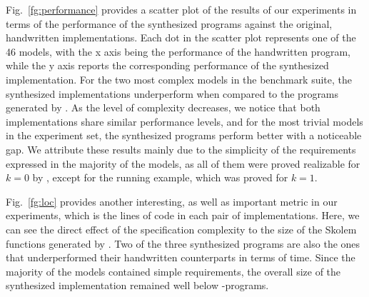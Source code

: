 Fig.~\ref{fg:performance} provides a scatter plot of the results of our
experiments in terms of the performance of the synthesized programs against the original, handwritten
implementations. Each dot in the scatter plot represents one of the 46
models, with the x axis being the performance of the handwritten
program, while the y axis reports the corresponding performance of the
synthesized implementation. For the two most complex models in the benchmark
suite, the synthesized implementations underperform when compared to the
programs generated by \lustrev. As the level of complexity decreases, we notice
that both implementations share similar performance levels, and for the most
trivial models in the experiment set, the synthesized programs perform better
with a noticeable gap. We attribute these results mainly due to the
simplicity of the requirements expressed in the majority of the models, as all of
them were proved realizable for $k=0$ by \jkind, except for the running example, which was proved for $k=1$.


Fig.~\ref{fg:loc} provides another interesting, as well as important metric in
our experiments, which is the lines of code in each pair of implementations.
Here, we can see the direct effect of the specification complexity to the size
of the Skolem functions generated by \aeval. Two of the three synthesized
programs are also the ones that underperformed their handwritten counterparts in
terms of time. Since the majority of the models contained simple
requirements, the overall size of the synthesized implementation remained well below \lustrev-programs.
%

